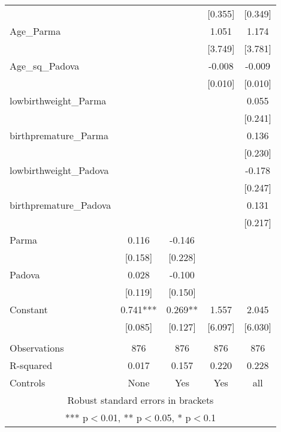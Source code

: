 \documentclass[]{article}
\begin{document}
\begin{tabular}{lcccc}
 &  &  & [0.355] & [0.349] \\
Age\_Parma &  &  & 1.051 & 1.174 \\
 &  &  & [3.749] & [3.781] \\
Age\_sq\_Padova &  &  & -0.008 & -0.009 \\
 &  &  & [0.010] & [0.010] \\
lowbirthweight\_Parma &  &  &  & 0.055 \\
 &  &  &  & [0.241] \\
birthpremature\_Parma &  &  &  & 0.136 \\
 &  &  &  & [0.230] \\
lowbirthweight\_Padova &  &  &  & -0.178 \\
 &  &  &  & [0.247] \\
birthpremature\_Padova &  &  &  & 0.131 \\
 &  &  &  & [0.217] \\
Parma & 0.116 & -0.146 &  &  \\
 & [0.158] & [0.228] &  &  \\
Padova & 0.028 & -0.100 &  &  \\
 & [0.119] & [0.150] &  &  \\
Constant & 0.741*** & 0.269** & 1.557 & 2.045 \\
 & [0.085] & [0.127] & [6.097] & [6.030] \\
 &  &  &  &  \\
Observations & 876 & 876 & 876 & 876 \\
R-squared & 0.017 & 0.157 & 0.220 & 0.228 \\
 Controls & None & Yes & Yes & all \\ \hline
\multicolumn{5}{c}{ Robust standard errors in brackets} \\
\multicolumn{5}{c}{ *** p$<$0.01, ** p$<$0.05, * p$<$0.1} \\
\end{tabular}
\end{document}
